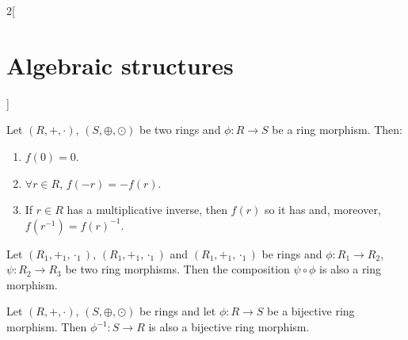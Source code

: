 \documentclass[../../../main.tex]{subfiles}
\begin{document}
\begin{multicols}{2}[\section{Algebraic structures}]
\begin{lemma}
\end{lemma}
\begin{prop}
    Let $(R,+,\cdot)$, $(S,\oplus,\odot)$ be two rings and $\phi:R\rightarrow S$ be a ring morphism. Then:
    \begin{enumerate}
        \item $f(0)=0$.
        \item $\forall r\in R$, $f(-r)=-f(r)$.
        \item If $r\in R$ has a multiplicative inverse, then $f(r)$ so it has and, moreover, $f(r^{-1})=f(r)^{-1}$.
    \end{enumerate}
\end{prop}
\begin{prop}
    Let $(R_1,+_1,\cdot_1)$, $(R_1,+_1,\cdot_1)$ and $(R_1,+_1,\cdot_1)$ be rings and $\phi:R_1\rightarrow R_2$, $\psi:R_2\rightarrow R_3$ be two ring morphisms. Then the composition $\psi\circ\phi$ is also a ring morphism.
\end{prop}
\begin{prop}
    Let $(R,+,\cdot)$, $(S,\oplus,\odot)$ be rings and let $\phi: R\rightarrow S$ be a bijective ring morphism. Then $\phi^{-1}: S\rightarrow R$ is also a bijective ring morphism.
\end{prop}

\end{multicols}
\end{document}

